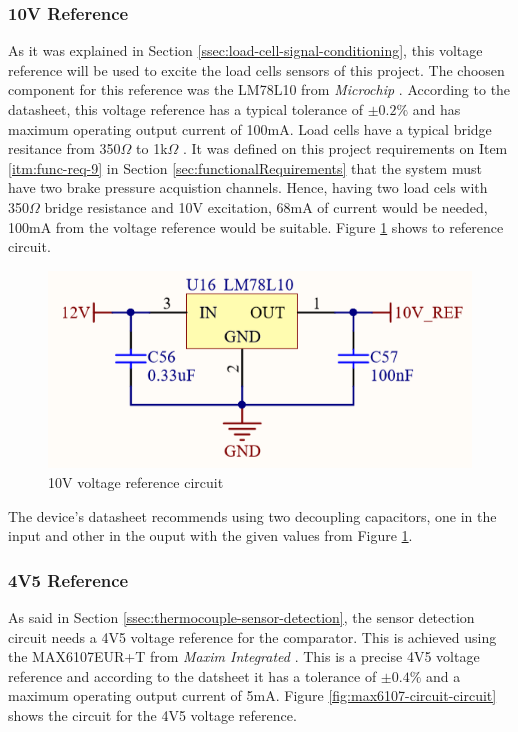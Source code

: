 		\subsubsection{10V Reference}\label{sssec:10v-reference}
			As it was explained in Section \ref{ssec:load-cell-signal-conditioning}, this voltage reference will be used to excite the load cells sensors of this project. The choosen component for this reference was the LM78L10 from \textit{Microchip} \cite{LM78L10-datasheet}. According to the datasheet, this voltage reference has a typical tolerance of $\pm 0.2\%$ and has maximum operating output current of 100mA. Load cells have a typical bridge resitance from 350$\Omega$ to 1k$\Omega$ \cite{GMIloadcell}. It was defined on this project requirements on Item \ref{itm:func-req-9} in Section \ref{sec:functionalRequirements} that the system must have two brake pressure acquistion channels. Hence, having two load cels with 350$\Omega$ bridge resistance and 10V excitation, 68mA of current would be needed, 100mA from the voltage reference would be suitable. Figure \ref{fig:LM78L10-circuit} shows to reference circuit.

			\begin{figure}[htbp]
				\centering
					\includegraphics[scale=1.35]{figuras/fig-LM78L10-circuit.png}
				\caption{10V voltage reference circuit \cite{LM78L10-circuit}}
				\label{fig:LM78L10-circuit}
			\end{figure}

			The device's datasheet recommends using two decoupling capacitors, one in the input and other in the ouput with the given values from Figure \ref{fig:LM78L10-circuit}.

		\subsubsection{4V5 Reference}\label{sssec:4v5-reference}

			As said in Section \ref{ssec:thermocouple-sensor-detection}, the sensor detection circuit needs a 4V5 voltage reference for the comparator. This is achieved using the MAX6107EUR+T from \textit{Maxim Integrated} \cite{max6107eur+t-datasheet}. This is a precise 4V5 voltage reference and according to the datsheet it has a tolerance of $\pm0.4\%$ and a maximum operating output current of 5mA. Figure \ref{fig:max6107-circuit-circuit} shows the circuit for the 4V5 voltage reference.

